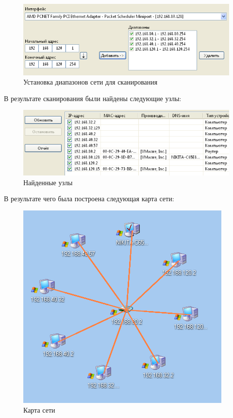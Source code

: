 \documentclass[14pt,a4paper,report]{report}
\begin{document}
\begin{figure}[h!]
	\centering
	\includegraphics[scale = 0.95]{images/1_1.png}
	\caption{Установка диапазонов сети для сканирования}
	\label{image:6}
\end{figure}

В результате сканирования были найдены следующие узлы:

\begin{figure}[h!]
	\centering
	\includegraphics[scale = 0.95]{images/1_2.png}
	\caption{Найденные узлы}
	\label{image:7}
\end{figure}

\clearpage

В результате чего была построена следующая карта сети:

\begin{figure}[h!]
	\centering
	\includegraphics[scale = 0.90]{images/1_3.png}
	\caption{Карта сети}
	\label{image:8}
\end{figure}
\end{document}
